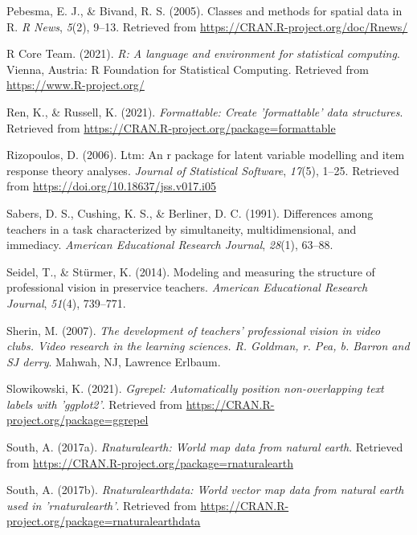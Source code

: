 \documentclass[
  man]{apa6}
\newlength{\cslhangindent}
\newenvironment{CSLReferences}[2] %
 {\begin{list}{}{%
  \setlength{\itemindent}{0pt}
  \setlength{\leftmargin}{0pt}
  \setlength{\parsep}{0pt}
  \ifodd #1
   \setlength{\leftmargin}{\cslhangindent}
   \setlength{\itemindent}{-1\cslhangindent}
  \fi
  \setlength{\itemsep}{#2\baselineskip}}}
 {\end{list}}
\begin{document}
\begin{CSLReferences}{1}{0}
Pebesma, E. J., \& Bivand, R. S. (2005). Classes and methods for spatial data in {R}. \emph{R News}, \emph{5}(2), 9--13. Retrieved from \url{https://CRAN.R-project.org/doc/Rnews/}

R Core Team. (2021). \emph{R: A language and environment for statistical computing}. Vienna, Austria: R Foundation for Statistical Computing. Retrieved from \url{https://www.R-project.org/}

Ren, K., \& Russell, K. (2021). \emph{Formattable: Create 'formattable' data structures}. Retrieved from \url{https://CRAN.R-project.org/package=formattable}

Rizopoulos, D. (2006). Ltm: An r package for latent variable modelling and item response theory analyses. \emph{Journal of Statistical Software}, \emph{17}(5), 1--25. Retrieved from \url{https://doi.org/10.18637/jss.v017.i05}

Sabers, D. S., Cushing, K. S., \& Berliner, D. C. (1991). Differences among teachers in a task characterized by simultaneity, multidimensional, and immediacy. \emph{American Educational Research Journal}, \emph{28}(1), 63--88.

Seidel, T., \& Stürmer, K. (2014). Modeling and measuring the structure of professional vision in preservice teachers. \emph{American Educational Research Journal}, \emph{51}(4), 739--771.

Sherin, M. (2007). \emph{The development of teachers' professional vision in video clubs. Video research in the learning sciences. R. Goldman, r. Pea, b. Barron and SJ derry}. Mahwah, NJ, Lawrence Erlbaum.

Slowikowski, K. (2021). \emph{Ggrepel: Automatically position non-overlapping text labels with 'ggplot2'}. Retrieved from \url{https://CRAN.R-project.org/package=ggrepel}

South, A. (2017a). \emph{Rnaturalearth: World map data from natural earth}. Retrieved from \url{https://CRAN.R-project.org/package=rnaturalearth}

South, A. (2017b). \emph{Rnaturalearthdata: World vector map data from natural earth used in 'rnaturalearth'}. Retrieved from \url{https://CRAN.R-project.org/package=rnaturalearthdata}


\end{CSLReferences}
\end{document}
